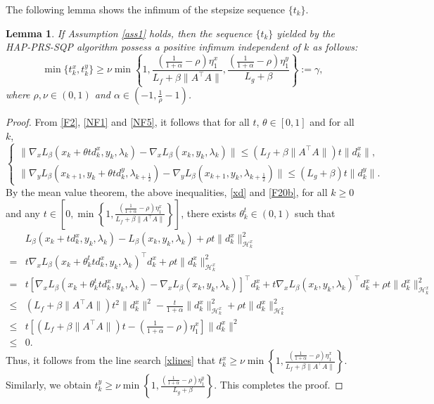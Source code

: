 \documentclass[pdflatex,sn-mathphys-num]{sn-jnl}%
\theoremstyle{thmstyleone}%
\newtheorem{lemma}{Lemma}
\theoremstyle{thmstyletwo}%
\theoremstyle{thmstylethree}%
\begin{document}
The following lemma shows the infimum of the stepsize sequence $\{t_k\}$.
\begin{lemma}\label{lem2}
	If Assumption \ref{ass1}  holds, then the sequence $\{t_k\}$ yielded by the HAP-PRS-SQP algorithm possess a positive infimum independent of $k$ as follows:
	\[\label{stepL}
	\min \{t_k^x,t_k^y\} \geq \nu\min \left\{1,\frac{(\frac{1}{1+\alpha}-\rho)\eta_1^{x}}
	{L_f+\beta\|A^{\top}A\|},\frac{(\frac{1}{1+\alpha}-\rho)\eta_1 ^y}{L_g+\beta}\right\}:=\gamma,
	\]
	where $\rho,\nu\in (0,1)$ and $\alpha \in (-1, \frac{1}{\rho}-1)$.
\end{lemma}
\begin{proof} From \eqref{F2}, \eqref{NF1} and \eqref{NF5}, it follows that for all $t$, $\theta \in[0,1]$ and for all $k$,
	\[\left\{
	\begin{array}{l}
		\|\nabla_{x} L_{\beta}(x_{k}+\theta t d_{k}^{x}, y_{k}, \lambda_{k})-\nabla_{x } L_{\beta}(x_{k}, y_{k}, \lambda_{k})\| \leq(L_{f}+\beta\|A^{\top} A\|) t\|d_{k}^{x}\|,\\
		\|\nabla_{y} L_{\beta}(x_{k+1}, y_{k}+\theta t d_{k}^{y}, \lambda_{k+\frac{1}{2}})-\nabla_{y} L_{\beta}(x_{k+1}, y_{k}, \lambda_{k+\frac{1}{2}})\| \leq(L_{g}+\beta)t\|d_{k}^{y}\|.
	\end{array}
	\right.\]
	By the mean value theorem, the above inequalities, \eqref{xd} and \eqref{F20b}, for all $k \geq 0$ and any $t \in\left[0,\min\left\{1,\frac{(\frac{1}{1+\alpha}-\rho)\eta_1^{x}}{L_f+\beta\|A^{\top}A\|}\right\}\right]$, there exists $\theta_k^t \in (0,1)$ such that
	\[\begin{aligned}
		&L_{\beta}(x_k+td_k^x,y_k,\lambda_k)-L_{\beta}(x_k,y_k,\lambda_k)+\rho t\|d_k^x\|_{\mathcal{H}_k^x}^2\\
		=&t \nabla_{x} L_{\beta}(x_{k}+\theta_{k}^{t} t d_{k}^{x}, y_{k}, \lambda_{k})^{\top} d_{k}^{x}+\rho t\|d_{k}^{x}\|_{\mathcal{H}_{k}^{x}}^{2}\\
		=&t[\nabla_{x} L_{\beta}(x_{k}+\theta_{k}^{t} t d_{k}^{x}, y_{k}, \lambda_{k})-\nabla_{x} L_{\beta}(x_{k}, y_{k}, \lambda_{k})]^{\top} d_{k}^{x}+t \nabla_{x} L_{\beta}(x_{k}, y_{k}, \lambda_{k})^{\top} d_{k}^{x}
		+\rho t\|d_{k}^{x}\|_{\mathcal{H}_{k}^{x}}^{2}\\
		\leq&(L_{f}+\beta\|A^{\top} A\|) t^{2}\|d_{k}^{x}\|^{2}-\frac{t}{1+\alpha}\|d_{k}^{x}\|_{\mathcal{H}_{k}^{x}}^{2}
		+\rho t\|d_{k}^{x}\|_{\mathcal{H}_{k}^{x}}^{2} \\
		\leq &t[(L_{f}+\beta\|A^{\top} A\|) t-(\frac{1}{1+\alpha}-\rho)\eta_1^{x}]\|d_{k}^{x}\|^{2} \\
		\leq & 0.
	\end{aligned}\]
	Thus, it follows from the line search \eqref{xlines} that $t_k^x \geq \nu\min\left\{1,\frac{(\frac{1}{1+\alpha}-\rho)\eta_1^{x}}{L_f+\beta\|A^{\top}A\|}\right\}$. Similarly, we obtain $t_k^y \geq \nu\min \left\{1,\frac{(\frac{1}{1+\alpha}-\rho)\eta_1 ^y}{L_g+\beta}\right\}$. This completes the proof.
\end{proof}
\end{document}
